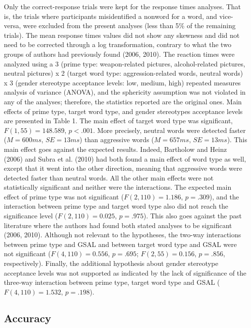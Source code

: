 \documentclass[authordate, serif, review]{jote-article}
\begin{document}
\begin{multicols}{2}
Only the correct-response trials were kept for the response times analyses. That is, the trials where participants misidentified a nonword for a word, and vice-versa, were excluded from the present analyses (less than 5\% of the remaining trials). The mean response times values did not show any skewness and did not need to be corrected through a log transformation, contrary to what the two groups of authors had previously found (2006, 2010). The reaction times were analyzed using a 3 (prime type: weapon-related pictures, alcohol-related pictures, neutral pictures) x 2 (target word type: aggression-related words, neutral words) x 3 (gender stereotype acceptance levels: low, medium, high) repeated measures analysis of variance (ANOVA), and the sphericity assumption was not violated in any of the analyses; therefore, the statistics reported are the original ones. Main effects of prime type, target word type, and gender stereotypes acceptance levels are presented in Table 1. The main effect of target word type was significant, $F (1, 55) = 148.589$, $p < .001$. More precisely, neutral words were detected faster ($M = 600ms$, $SE = 13ms$) than aggressive words ($M = 657ms$, $SE = 13ms$). This main effect goes against the expected results. Indeed, Bartholow and Heinz (2006) and Subra et al. (2010) had both found a main effect of word type as well, except that it went into the other direction, meaning that aggressive words were detected faster than neutral words. All the other main effects were not statistically significant and neither were the interactions. The expected main effect of prime type was not significant ($F (2, 110) = 1.186$, $p = .309$), and the interaction between prime type and target word type also did not reach the significance level ($F (2, 110) = 0.025$, $p = .975$). This also goes against the past literature where the authors had found both stated analyses to be significant (2006, 2010). Although not relevant to the hypotheses, the two-way interactions between prime type and GSAL and between target word type and GSAL were not significant ($F (4, 110) = 0.556$, $p = .695$; $F (2, 55) = 0.156$, $p = .856$, respectively). Finally, the additional hypothesis about gender stereotype acceptance levels was not supported as indicated by the lack of significance of the three-way interaction between prime type, target word type and GSAL ($F (4, 110) = 1.532$, $p = .198$).

{}
\subsection*{Accuracy}


\end{multicols}
\end{document}
